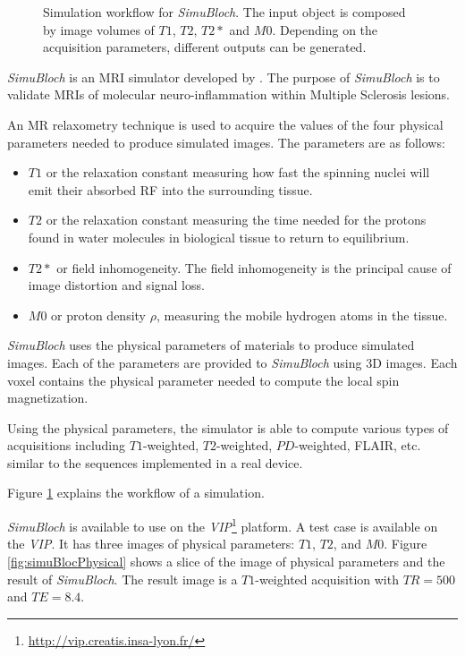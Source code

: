 \begin{figure}
 \centering   
 \caption[\textit{SimuBloch}]{Simulation workflow for \textit{SimuBloch}. The input object is composed by image volumes of $T1$, $T2$, $T2*$ and $M0$. Depending on the 
			       acquisition parameters, different outputs can be generated.}
 \label{fig:simuBloch}  
\end{figure}

\textit{SimuBloch} is an MRI simulator developed by \cite{caom3}. 
The purpose of \textit{SimuBloch} is to validate 
MRIs of molecular neuro-inflammation within Multiple Sclerosis lesions.

An MR relaxometry technique is used 
to acquire the values of the four physical parameters needed to produce simulated images. 
The parameters are as follows: 

\begin{itemize}
 \item $T1$ or the relaxation constant measuring how fast the spinning nuclei will emit their absorbed RF into the surrounding tissue.
 \item $T2$ or the relaxation constant measuring the time needed for the protons found in water molecules in biological tissue to return to equilibrium.  
 \item $T2*$ or field inhomogeneity. The field inhomogeneity is the principal cause of image distortion and signal loss.
 \item $M0$ or proton density $\rho$, measuring the mobile hydrogen atoms in the tissue. 
\end{itemize}

\textit{SimuBloch} uses the physical parameters of materials to produce simulated images. 
Each of the parameters are provided to \textit{SimuBloch} using 3D images.
Each voxel contains the physical parameter needed to compute the local spin magnetization. %

Using the physical parameters, the simulator is able to compute
various types of acquisitions including  
$T1$-weighted, $T2$-weighted, $PD$-weighted, FLAIR, etc. 
similar to the sequences implemented in a real device. 

Figure \ref{fig:simuBloch} explains the workflow of a simulation. 

\textit{SimuBloch} is available to use on the \textit{ VIP}\footnote{\url{http://vip.creatis.insa-lyon.fr/}} platform. 
A test case is available on the \textit{ VIP}. It has three images of physical parameters: $T1$, $T2$, and $M0$. 
Figure \ref{fig:simuBlocPhysical} shows a slice of the image of physical parameters and the result 
of \textit{SimuBloch}. The result image is a $T1$-weighted acquisition with $TR=500$ and $TE=8.4$.

